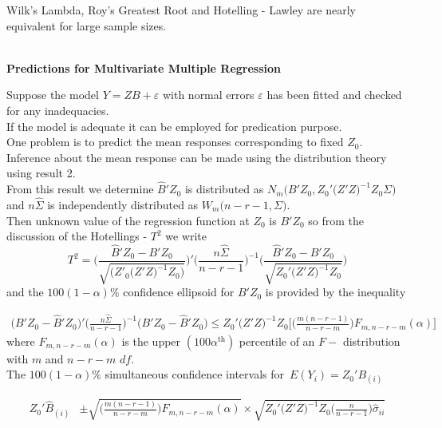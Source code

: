 \documentclass[11pt,a4paper]{article}
\theoremstyle{definition}
\begin{document}
Wilk's Lambda, Roy's Greatest Root and Hotelling - Lawley are nearly equivalent for large sample sizes.\\\\




\begin{center}
\textbf{Predictions for Multivariate Multiple Regression}
\end{center}
Suppose the model $Y= ZB + \varepsilon$ with normal errors $\varepsilon$ has been fitted and checked for any inadequacies.\\ If the model is adequate it can be employed for predication purpose.\\
One problem is to predict the mean responses corresponding to fixed $Z_0$.\\
Inference about the mean response can be made using the distribution theory using result 2.\\


From this result we determine $\widehat{B}'Z_0$ is distributed as $N_m\big(B'Z_0,Z_0'\big(Z'Z\big)^{-1}Z_0\Sigma\big)$ and $n\widehat{\Sigma}$ is independently distributed as $W_m\big(n-r-1,\Sigma\big)$.\\

Then unknown value of the regression  function at $Z_0$ is $B'Z_0$ so from the discussion of the Hotellings - $T^2$ we write
\begin{equation}\tag{4}
T^2 = \Bigg(\frac{\widehat{B}'Z_0-B'Z_0}{\sqrt{\Big(Z'_0\big(Z'Z\big)^{-1}Z_0\Big)}}\Bigg)'\Bigg(\frac{n\widehat{\Sigma}}{n-r-1}\Bigg)^{-1} \Bigg(\frac{\widehat{B}'Z_0-B'Z_0}{\sqrt{Z_0'\big(Z'Z\big)^{-1}Z_0}}\Bigg)
\end{equation} and the $100(1-\alpha)\%$ confidence ellipsoid for $B'Z_0$ is provided by the inequality 

\begin{align*}
\big(B'Z_0-\widehat{B}'Z_0\big)'\Bigg(\frac{n\widehat{\Sigma}}{n-r-1}\Bigg)^{-1}\big(B'Z_0-\widehat{B}'Z_0\big) \leq Z_0'\big(Z'Z\big)^{-1}Z_0\Bigg[\Bigg(\frac{m(n-r-1)}{n-r-m}\Bigg)F_{m,n-r-m}(\alpha)\Bigg]
\end{align*}
where $F_{m,n-r-m}(\alpha)$ is the upper $(100 \alpha^{\text{th}})$ percentile of an $F-$ distribution with $m$ and $n-r-m$ $df$.\\

The $100(1-\alpha)\%$ simultaneous confidence intervals for \,$E(Y_i)   = Z_0'B_{(i)}$

\begin{align*}
Z_0'\widehat{B}_{(i)} & \pm \sqrt{\Bigg(\frac{m(n-r-1)}{n-r-m}\Bigg)F_{m,n-r-m}(\alpha)}\times \sqrt{Z_0'\big(Z'Z\big)^{-1}Z_0\Bigg(\frac{n}{n-r-1}\Bigg)\widehat{\sigma}_{ii}}
\end{align*}
\end{document}
